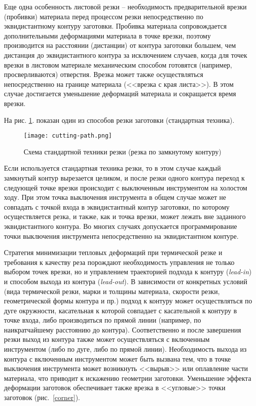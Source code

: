 Еще одна особенность листовой резки –
необходимость предварительной врезки (пробивки)
материала перед процессом резки непосредственно
по эквидистантному контуру заготовки.
Пробивка материала сопровождается дополнительными
деформациями материала в точке врезки,
поэтому производится на расстоянии (дистанции)
от контура заготовки большем,
чем дистанция до эквидистантного контура за исключением случаев,
когда для точек врезки в листовом материале механическим способом
готовятся (например, просверливаются)
отверстия.
Врезка может также осуществляться
непосредственно на границе материала
(<<врезка с края листа>>).
В этом случае достигается уменьшение
деформаций материала и сокращается время врезки.

На рис. \ref{standard-cutting}.
показан
один из способов резки заготовки
(стандартная техника).

\begin{figure}[h]
  \begin{center}
  \texttt{[image: cutting-path.png]}
  \caption{Схема стандартной техники резки (резка по замкнутому контуру)}
  \label{standard-cutting}
  \end{center}
\end{figure}

Если используется стандартная техника резки,
то в этом случае каждый замкнутый контур вырезается целиком,
и после резки одного контура переход к следующей точке врезки
происходит с выключенным инструментом на холостом ходу.
При этом точка выключения инструмента
в общем случае
может не совпадать с точкой входа в эквидистантный контур заготовки,
по которому осуществляется резка, и также,
как и точка врезки,
может лежать вне заданного эквидистантного контура.
Во многих случаях допускается программирование точки выключения
инструмента непосредственно на эквидистантном контуре.

Стратегия минимизации тепловых деформаций при термической резке
и требования к качеству реза порождают необходимость управления
не только выбором точек врезки,
но и управлением траекторией подхода к контуру
(\textit{lead-in})
и способом выхода из контура
(\textit{lead-out}).
В зависимости от конкретных условий
(вида термической резки, марки и толщины материала,
скорости резки, геометрической формы контура и пр.)
подход к контуру может осуществляться по дуге окружности,
касательная к которой совпадает с касательной к контуру в точке входа,
либо производиться по прямой линии
(например, по наикратчайшему расстоянию до контура).
Соответственно и после завершения резки выход из контура
также может осуществляться с включенным инструментом
(либо по дуге, либо по прямой линии).
Необходимость выхода из контура с включенным
инструментом может быть вызвана тем,
что в точке выключения инструмента может возникнуть
<<вырыв>> или оплавление части материала,
что приводит к искажению геометрии заготовки.
Уменьшение эффекта деформации заготовок обеспечивает
также врезка в <<угловые>> точки заготовок
(рис.~\ref{corner}).

